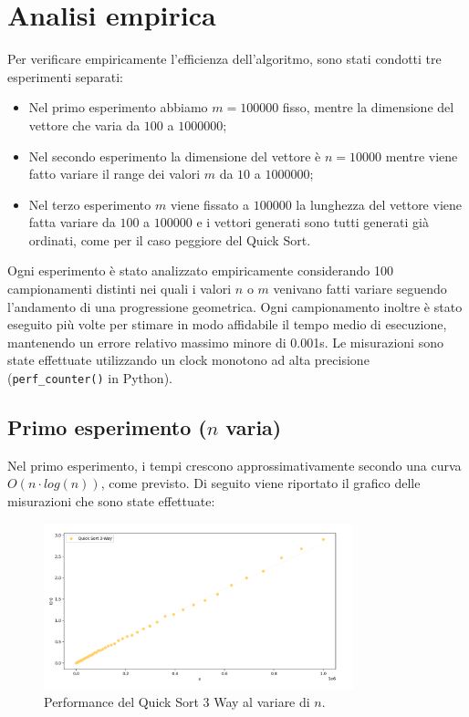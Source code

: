 \documentclass[a4paper, 12pt, oneside]{book}
\begin{document}
\section{Analisi empirica}

Per verificare empiricamente l'efficienza dell'algoritmo, sono stati condotti tre esperimenti separati:

\begin{itemize}
    \item Nel primo esperimento abbiamo \(m = 100000\) fisso, mentre la dimensione del vettore che varia da \(100\) a $1000000$;
    \item Nel secondo esperimento la dimensione del vettore è \(n = 10000\) mentre viene fatto variare il range dei valori \(m\) da $10$ a $1000000$;
    \item Nel terzo esperimento $m$ viene fissato a $100000$ la lunghezza del vettore viene fatta variare da $100$ a $100000$ e i vettori generati sono tutti generati già ordinati, come per il caso peggiore del Quick Sort.
\end{itemize}

\noindent Ogni esperimento è stato analizzato empiricamente considerando 100 campionamenti distinti nei quali i valori $n$ o $m$ venivano fatti variare seguendo l'andamento di una progressione geometrica.
Ogni campionamento inoltre è stato eseguito più volte per stimare in modo affidabile il tempo medio di esecuzione, mantenendo un errore relativo massimo minore di 0.001s.
Le misurazioni sono state effettuate utilizzando un clock monotono ad alta precisione (\texttt{perf\_counter()} in Python). \\


\subsection{Primo esperimento ($n$ varia)}

Nel primo esperimento, i tempi crescono approssimativamente secondo una curva \(O(n \cdot log(n))\), come previsto. Di seguito viene riportato il grafico delle misurazioni che sono state effettuate:


\begin{figure}[H]
    \centering
    \includegraphics[width=0.8\textwidth]{images/grafico_quick_sort_3_way_n.png}
    \caption{Performance del Quick Sort 3 Way al variare di \(n\).}
    \label{fig:quick_sort_3_way_n}
\end{figure}
\end{document}
